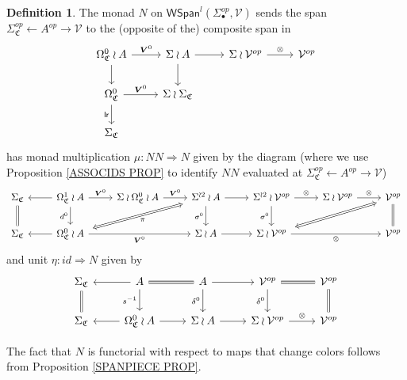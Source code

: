 \documentclass[a4paper,10pt
,draft
]{article}%
\numberwithin{equation}{section}
\numberwithin{figure}{section}
\theoremstyle{definition} %
\newtheorem{definition}[equation]{Definition}%
\newcommand{\V}{\ensuremath{\mathcal V}}
\newcommand{\1}{\ensuremath{\mathbbm 1}}%
\begin{document}
\begin{definition}\label{NCOLOR DEF}
The monad $N$ on 
$\mathsf{WSpan}^l(\Sigma_{\bullet}^{op},\mathcal{V})$
sends the span 
$\Sigma^{op}_{\mathfrak{C}} \leftarrow A^{op} \to \mathcal{V}$
to the (opposite of the) composite span in
\begin{equation}\label{NCOLOR EQ}
\begin{tikzcd}
	\Omega^0_{\mathfrak{C}} \wr A \ar{r}{\boldsymbol{V}^0} \ar{d} &
	\Sigma \wr A  \ar{d} \ar{r} &
	\Sigma \wr \mathcal{V}^{op} \ar{r}{\otimes} &
	\mathcal{V}^{op}
\\
	\Omega^0_{\mathfrak{C}} \ar{r}{\boldsymbol{V}^0} \arrow[d, "\mathsf{lr}"'] &
	\Sigma \wr \Sigma_{\mathfrak{C}} 
\\
	\Sigma_{\mathfrak{C}}
\end{tikzcd}
\end{equation}
has monad multiplication
$\mu \colon N N
\Rightarrow 
N$ given by the diagram
(where we use Proposition \ref{ASSOCIDS PROP} to identify 
$NN$ evaluated at 
$\Sigma^{op}_{\mathfrak{C}} \leftarrow A^{op} \to \V$)
\begin{equation}\label{NMONMULTTR EQ}
\begin{tikzcd}
	\Sigma_{\mathfrak{C}} \ar[equal]{d}&
	\Omega^1_{\mathfrak{C}} \wr A \ar{l} \arrow[r, "\boldsymbol{V}^0"] \ar{d}[swap]{d^0}&
	\Sigma \wr \Omega^0_{\mathfrak{C}} \wr A \arrow[r, "\boldsymbol{V}^0"] &
	|[alias=U]|
	\Sigma^{\wr 2} \wr A \ar{r} \ar{d}[swap]{\sigma^0} &
	\Sigma^{\wr 2} \wr \mathcal{V}^{op} \ar{r}{\otimes} \ar{d}[swap]{\sigma^0} &
	\Sigma \wr \mathcal{V}^{op} \ar{r}{\otimes} &
	|[alias=UU]|
	\mathcal{V}^{op} \ar[equal]{d}
\\
	\Sigma_{\mathfrak{C}} &
	|[alias=V]|
	\Omega^0_{\mathfrak{C}} \wr A \ar{l} \ar{rr}[swap]{\boldsymbol{V}^0} & &
	\Sigma \wr A \ar{r} &
	|[alias=VV]|
	\Sigma \wr \mathcal{V}^{op} \ar{rr}[swap]{\otimes} & &
	\mathcal{V}^{op}
\arrow[Leftrightarrow, from=V, to=U,shorten >=0.15cm,shorten <=0.15cm
,swap,"\pi"
]
\arrow[Leftrightarrow, from=VV, to=UU,shorten >=0.15cm,shorten <=0.15cm
]
\end{tikzcd}
\end{equation}
and unit
$\eta \colon id \Rightarrow N$ given by
\begin{equation}\label{NMONIDTR EQ}
\begin{tikzcd}
	\Sigma_{\mathfrak{C}} \ar[equal]{d} & 
	A \ar{d}[swap]{s^{-1}} \ar{l} \ar[equal]{r} &
	A \ar{d}[swap]{\delta^0} \ar{r} &
	\mathcal{V}^{op} \ar{d}[swap]{\delta^0} \ar[equal]{r} &
	\mathcal{V}^{op} \ar[equal]{d}
\\
	\Sigma_{\mathfrak{C}} &
	\Omega^0_{\mathfrak{C}} \wr A \ar{l} \ar{r} &
	\Sigma \wr A \ar{r} &
	\Sigma \wr \mathcal{V}^{op} \ar{r}{\otimes} &
	\mathcal{V}^{op}
\end{tikzcd}
\end{equation}

The fact that $N$ is functorial
with respect to maps that change colors follows from Proposition \ref{SPANPIECE PROP}.
\end{definition}
\end{document}
